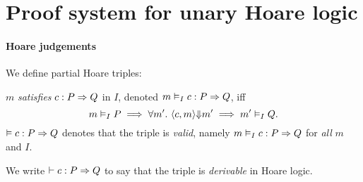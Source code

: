 
\section{Proof system for unary Hoare logic}

\paragraph{Hoare judgements}
We define partial Hoare triples:
\begin{definition}
    $m$ \emph{satisfies}
    $\Triple c : P => Q$ in $I$,
    denoted $\AVALmi \Triple c : P => Q$,
    iff    
    $$\AVALmi P \implies \forall m'.\
    \Yields(c,m,m') \implies
    \AVAL m'|I|-Q.$$
%
$\AVALU \Triple c : P => Q$ denotes
that the triple is \emph{valid},
namely $\AVALmi \Triple c : P => Q$
for \emph{all} $m$ and $I$.
\end{definition}

We write $\DER \Triple c : P => Q$ to say that
the triple is \emph{derivable} in Hoare logic.

\iffalse
\begin{displaymath}
\begin{array}{lcl}
    \Triple c : P => Q
    & \triangleq &
    \forall m \in P, m'.\
    \Cfg(c,m) \sstepstotrans \Cfg(\Skip,m') \implies
    m' \in Q
\end{array}
\end{displaymath}
\fi

